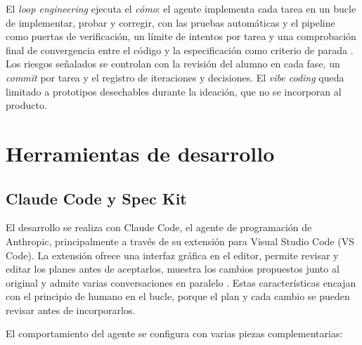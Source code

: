 El \emph{loop engineering} ejecuta el \emph{cómo}: el agente implementa cada tarea en un bucle de implementar, probar y corregir, con las pruebas automáticas y el pipeline como puertas de verificación, un límite de intentos por tarea y una comprobación final de convergencia entre el código y la especificación como criterio de parada \citep{github2026speckitquickstart}. Los riesgos señalados se controlan con la revisión del alumno en cada fase, un \emph{commit} por tarea y el registro de iteraciones y decisiones. El \emph{vibe coding} queda limitado a prototipos desechables durante la ideación, que no se incorporan al producto.


\section{Herramientas de desarrollo}\label{sec:Herramientas}

\subsection{Claude Code y Spec Kit}\label{subsec:ClaudeCode}

El desarrollo se realiza con Claude Code, el agente de programación de Anthropic, principalmente a través de su extensión para Visual Studio Code (VS Code). La extensión ofrece una interfaz gráfica en el editor, permite revisar y editar los planes antes de aceptarlos, muestra los cambios propuestos junto al original y admite varias conversaciones en paralelo \citep{anthropic-vscode}. Estas características encajan con el principio de humano en el bucle, porque el plan y cada cambio se pueden revisar antes de incorporarlos.

El comportamiento del agente se configura con varias piezas complementarias:

